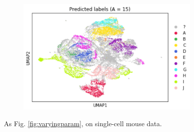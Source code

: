 \documentclass{article}
\begin{document}
\begin{figure}
\begin{subfigure}[t]{0.34\textwidth}
        \includegraphics[width=\linewidth]{figs/notMNIST/notMNIST_preds_Aeq15.png} %
    \end{subfigure}
    \hfill
  \caption{As Fig. \ref{fig:varyingparam}, on single-cell mouse data.}
  \label{fig:varyingparam_muris}
\end{figure}
\end{document}
